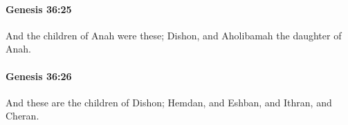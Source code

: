 		\paragraph{Genesis 36:25} %
			\label{GENESIS-36-25}

			And the children of Anah were these; Dishon, and Aholibamah the daughter of Anah.


		\paragraph{Genesis 36:26} %
			\label{GENESIS-36-26}

			And these are the children of Dishon; Hemdan, and Eshban, and Ithran, and Cheran.


